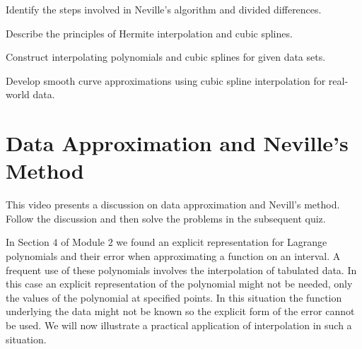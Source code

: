 \begin{mlos}
\item Identify the steps involved in Neville’s algorithm and divided differences.
\item Describe the principles of Hermite interpolation and cubic splines.
\item Construct interpolating polynomials and cubic splines for given data sets.
\item Develop smooth curve approximations using cubic spline interpolation for real-world data. 
\end{mlos}

\section{Data Approximation and Neville's Method}
\videolesson
\begin{selfvideo}[1]
This video presents a discussion on data approximation and Nevill's method. Follow the discussion and then solve the problems in the subsequent quiz.
\end{selfvideo}
In Section $4$ of Module $2$ we found an explicit representation for Lagrange polynomials and their error when approximating a function on an interval. A frequent use of these polynomials involves the interpolation of tabulated data. In this case an explicit representation of the polynomial might not be needed, only the values of the polynomial at specified points. In this situation the function underlying the data might not be known so the explicit form of the error cannot be used. We will now illustrate a practical application of interpolation in such a situation.

